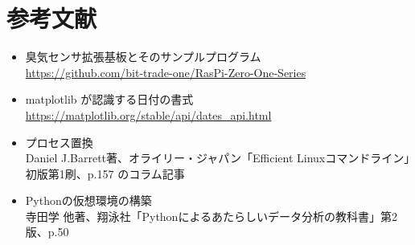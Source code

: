 \documentclass[12pt,a4paper,uplatex]{jsarticle}
\begin{document}

\section{参考文献}

\begin{itemize}
	\item 臭気センサ拡張基板とそのサンプルプログラム\\
	\url{https://github.com/bit-trade-one/RasPi-Zero-One-Series}
	\item matplotlib が認識する日付の書式\\
	\url{https://matplotlib.org/stable/api/dates_api.html}
	\item プロセス置換\\
	Daniel J.Barrett著、オライリー・ジャパン「Efficient Linuxコマンドライン」初版第1刷、p.157 のコラム記事
	\item Pythonの仮想環境の構築\\
	寺田学 他著、翔泳社「Pythonによるあたらしいデータ分析の教科書」第2版、p.50
\end{itemize}
\end{document}
